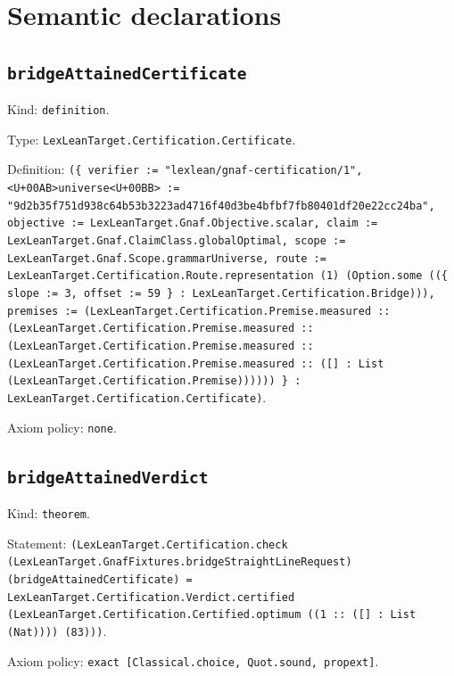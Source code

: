 \documentclass[11pt]{article}
\begin{document}
\section*{Semantic declarations}
\subsection*{\texttt{bridgeAttainedCertificate}}
\noindent Kind: \texttt{definition}.\par
\noindent Type: \texttt{LexLeanTarget.Certification.Certificate}.\par
\noindent Definition: \texttt{(\{ verifier := "lexlean/gnaf-certification/1", <U+00AB>universe<U+00BB> := "9d2b35f751d938c64b53b3223ad4716f40d3be4bfbf7fb80401df20e22cc24ba", objective := LexLeanTarget.Gnaf.Objective.scalar, claim := LexLeanTarget.Gnaf.ClaimClass.globalOptimal, scope := LexLeanTarget.Gnaf.Scope.grammarUniverse, route := LexLeanTarget.Certification.Route.representation (1) (Option.some ((\{ slope := 3, offset := 59 \} : LexLeanTarget.Certification.Bridge))), premises := (LexLeanTarget.Certification.Premise.measured :: (LexLeanTarget.Certification.Premise.measured :: (LexLeanTarget.Certification.Premise.measured :: (LexLeanTarget.Certification.Premise.measured :: ([] : List (LexLeanTarget.Certification.Premise)))))) \} : LexLeanTarget.Certification.Certificate)}.\par
\noindent Axiom policy: \texttt{none}.\par
\subsection*{\texttt{bridgeAttainedVerdict}}
\noindent Kind: \texttt{theorem}.\par
\noindent Statement: \texttt{(LexLeanTarget.Certification.check (LexLeanTarget.GnafFixtures.bridgeStraightLineRequest) (bridgeAttainedCertificate) = LexLeanTarget.Certification.Verdict.certified (LexLeanTarget.Certification.Certified.optimum ((1 :: ([] : List (Nat)))) (83)))}.\par
\noindent Axiom policy: \texttt{exact [Classical.choice, Quot.sound, propext]}.\par
\end{document}
